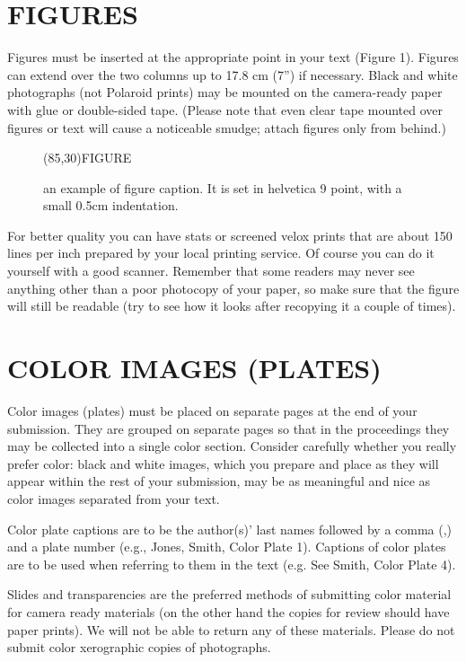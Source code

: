 \section{FIGURES}
Figures must be inserted at the appropriate point in your text (Figure 
1).  Figures can extend over the two columns up to 17.8 cm (7'') if 
necessary.  Black and white photographs (not Polaroid prints) may be 
mounted on the camera-ready paper with glue or double-sided tape.  
(Please note that even clear tape mounted over figures or text will 
cause a noticeable smudge; attach figures only from behind.)

\begin{figure}
\unitlength 1mm
\framebox(85,30){\large FIGURE}
\caption{an example of figure caption. It is set in helvetica 9 point,
with a small 0.5cm indentation.}
\end{figure}

For better quality you can have stats or screened 
velox prints that are about 150 lines per inch prepared by your local 
printing service.  Of course you can do it yourself with a good 
scanner.  Remember that some readers may never see anything other than 
a poor photocopy of your paper, so make sure that the figure will 
still be readable (try to see how it looks after recopying it a couple 
of times).

\section{COLOR IMAGES (PLATES)}
Color images (plates) must be placed on separate pages at the end of 
your submission. They are grouped on separate pages so that in the 
proceedings they may be collected into a single color section. 
Consider carefully whether you really prefer color: black and white 
images, which you prepare and place as they will appear within the 
rest of your submission, may be as meaningful and nice as color images 
separated from your text.

Color plate captions are to be the author(s)' last 
names followed by a comma (,) and a plate number (e.g., Jones, Smith, 
Color Plate 1). Captions of color plates are to be used when referring 
to them in the text (e.g. See Smith, Color Plate 4).

Slides and transparencies are the preferred methods 
of submitting color material for camera ready materials (on the other 
hand the copies for review should have paper prints). We will not be 
able to return any of these materials. Please do not submit color 
xerographic copies of photographs. 

